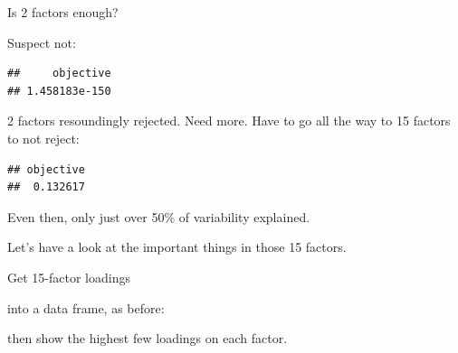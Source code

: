\documentclass[
  ignorenonframetext,
]{beamer}
\newenvironment{Shaded}{\begin{snugshade}}{\end{snugshade}}
\newcommand{\DataTypeTok}[1]{\textcolor[rgb]{0.13,0.29,0.53}{#1}}
\newcommand{\DecValTok}[1]{\textcolor[rgb]{0.00,0.00,0.81}{#1}}
\newcommand{\FloatTok}[1]{\textcolor[rgb]{0.00,0.00,0.81}{#1}}
\newcommand{\KeywordTok}[1]{\textcolor[rgb]{0.13,0.29,0.53}{\textbf{#1}}}
\newcommand{\NormalTok}[1]{#1}
\newcommand{\OperatorTok}[1]{\textcolor[rgb]{0.81,0.36,0.00}{\textbf{#1}}}
\newcommand{\StringTok}[1]{\textcolor[rgb]{0.31,0.60,0.02}{#1}}
\begin{document}
\begin{frame}[fragile]{Is 2 factors enough?}
\protect\hypertarget{is-2-factors-enough}{}

Suspect not:

\begin{Shaded}
\end{Shaded}

\begin{verbatim}
##     objective 
## 1.458183e-150
\end{verbatim}

2 factors resoundingly rejected. Need more. Have to go all the way to 15
factors to not reject:

\begin{Shaded}
\end{Shaded}

\begin{verbatim}
## objective 
##  0.132617
\end{verbatim}

Even then, only just over 50\% of variability explained.

Let's have a look at the important things in those 15 factors.

\end{frame}

\begin{frame}[fragile]{Get 15-factor loadings}
\protect\hypertarget{get-15-factor-loadings}{}

into a data frame, as before:

\small

\begin{Shaded}
\end{Shaded}

\normalsize

then show the highest few loadings on each factor.

\end{frame}
\end{document}
